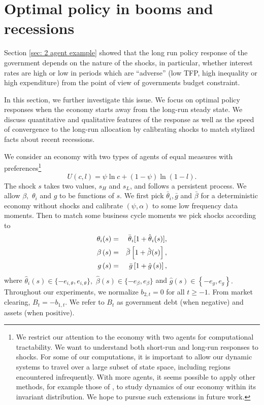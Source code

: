 \documentclass[thmsb,11pt]{article}
\begin{document}
\section{\protect\smallskip Optimal policy in booms and recessions}\label{Sec: numerical}

\smallskip

Section \ref{sec: 2 agent example} showed that the long run policy
response of the government depends on the nature of the shocks, in
particular, whether interest rates are high or low in periods which are ``adverse'' (low TFP, high inequality or high expenditure) from the point of view of governments budget constraint.

In this section, we further investigate this issue.
We focus on  optimal policy responses when the economy starts away
from the long-run steady state. We discuss  quantitative and qualitative
features of the response as well as the speed of convergence to the long-run
allocation by calibrating  shocks to match stylized facts about recent
recessions.

\smallskip We consider an economy with two types of agents%
of equal measures with preferences\footnote{%
We restrict our attention to the economy with two agents for computational
tractability. We want to understand both short-run and long-run
responses to shocks.  For some of our computations,  it is important to allow our
dynamic systems to travel over a large subset of state space, including regions encountered infrequently.
With more agents, it seems  possible to apply other methods,  for example those of  \cite{Judd2011}, to study dynamics of our economy within its invariant
distribution. We hope to pursue such extensions in  future work.}
\begin{equation*}
U\left( c,l\right) =\psi \ln c+\left( 1-\psi \right) \ln \left( 1-l\right) .
\end{equation*}%
The shock $s$   takes two values, $s_{H}$ and $s_{L}$, and follows a persistent
process. We allow $\beta ,$ $\theta _{i}$ and $g$ to be
functions of $s.$ We first pick $\bar{\theta}_{i},\bar{g}$
and $\bar{\beta}$ for a deterministic economy without shocks and calibrate $%
\left( \psi ,\alpha \right) $ to some low frequency  data moments. Then to match some business cycle moments we
pick shocks  according to
\begin{eqnarray}\label{eqn:newstar}
\theta _{i}(s) &=&\bar{\theta}_{i}[1+{\hat{\theta}}_{i}(s)], \cr
\beta \left( s\right) &=&\bar{\beta}\left[ 1+\hat{\beta}(s)\right] , \cr
g\left( s\right) &=&\bar{g}\left[ 1+\hat{g}\left( s\right) \right] ,
\end{eqnarray}%
where $\hat{\theta}_{i}\left( s\right) \in \{-e_{i,\theta },e_{i,\theta }\},$
$\hat{\beta}\left( s\right) \in \{-e_{\beta },e_{\beta }\}$ and $\hat{g}%
\left( s\right) \in \left\{ -e_{g},e_{g}\right\} .$ Throughout  our
experiments, we normalize $b_{2,t}=0$ for all $t\geq -1$. From market
clearing,  $B_{t}=-b_{1,t}$.  We refer to $B_{t}$ as
government debt (when negative) and  assets (when positive).
\end{document}
